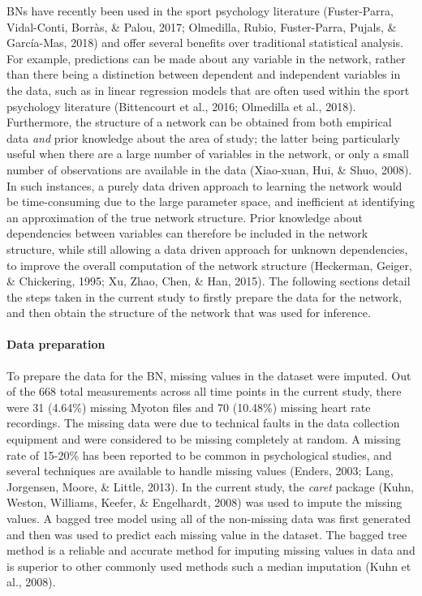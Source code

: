 \documentclass[man,floatsintext]{apa6}
\let\oldparagraph\paragraph
\renewcommand{\paragraph}[1]{\oldparagraph{#1}\mbox{}}
\begin{document}
BNs have recently been used in the sport psychology literature (Fuster-Parra, Vidal-Conti, Borràs, \& Palou, 2017; Olmedilla, Rubio, Fuster-Parra, Pujals, \& García-Mas, 2018) and offer several benefits over traditional statistical analysis.
For example, predictions can be made about any variable in the network, rather than there being a distinction between dependent and independent variables in the data, such as in linear regression models that are often used within the sport psychology literature (Bittencourt et al., 2016; Olmedilla et al., 2018).
Furthermore, the structure of a network can be obtained from both empirical data \emph{and} prior knowledge about the area of study; the latter being particularly useful when there are a large number of variables in the network, or only a small number of observations are available in the data (Xiao-xuan, Hui, \& Shuo, 2008).
In such instances, a purely data driven approach to learning the network would be time-consuming due to the large parameter space, and inefficient at identifying an approximation of the true network structure.
Prior knowledge about dependencies between variables can therefore be included in the network structure, while still allowing a data driven approach for unknown dependencies, to improve the overall computation of the network structure (Heckerman, Geiger, \& Chickering, 1995; Xu, Zhao, Chen, \& Han, 2015).
The following sections detail the steps taken in the current study to firstly prepare the data for the network, and then obtain the structure of the network that was used for inference.

\hypertarget{data-preparation}{%
\paragraph{Data preparation}\label{data-preparation}}

To prepare the data for the BN, missing values in the dataset were imputed.
Out of the 668 total measurements across all time points in the current study, there were 31 (4.64\%) missing Myoton files and 70 (10.48\%) missing heart rate recordings. The missing data were due to technical faults in the data collection equipment and were considered to be missing completely at random.
A missing rate of 15-20\% has been reported to be common in psychological studies, and several techniques are available to handle missing values (Enders, 2003; Lang, Jorgensen, Moore, \& Little, 2013).
In the current study, the \emph{caret} package (Kuhn, Weston, Williams, Keefer, \& Engelhardt, 2008) was used to impute the missing values.
A bagged tree model using all of the non-missing data was first generated and then was used to predict each missing value in the dataset.
The bagged tree method is a reliable and accurate method for imputing missing values in data and is superior to other commonly used methods such a median imputation (Kuhn et al., 2008).
\end{document}
